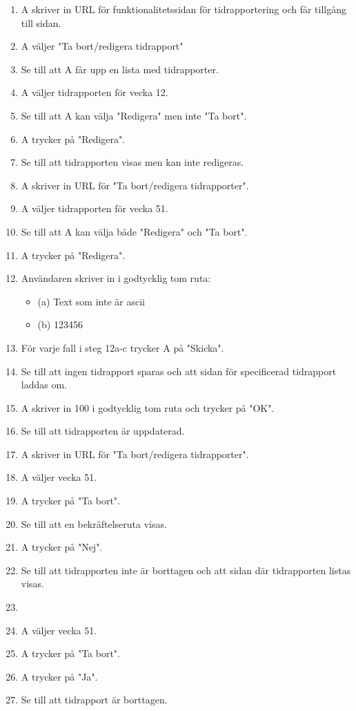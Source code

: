 \documentclass[a4paper]{article}
\begin{document}
\begin{ST}
\begin{enumerate}
\item A skriver in URL för funktionalitetssidan för tidrapportering och får tillgång till sidan.
\item A väljer "Ta bort/redigera tidrapport"
\item Se till att A får upp en lista med tidrapporter.
\item A väljer tidrapporten för vecka 12.
\item Se till att A kan välja "Redigera" men inte "Ta bort".
\item A trycker på "Redigera".
\item Se till att tidrapporten visas men kan inte redigeras.
\item A skriver in URL för "Ta bort/redigera tidrapporter".
\item A väljer tidrapporten för vecka 51.
\item Se till att A kan välja både "Redigera" och "Ta bort".
\item A trycker på "Redigera".
\item Användaren skriver in i godtycklig tom ruta:
\begin{itemize}
\item[] (a) Text som inte är ascii
\item[] (b) 123456
\end{itemize}
\item För varje fall i steg 12a-c trycker A på "Skicka". 
\item Se till att ingen tidrapport sparas och att sidan för specificerad tidrapport laddas om.
\item A skriver in 100 i godtycklig tom ruta och trycker på "OK".
\item Se till att tidrapporten är uppdaterad.
\item A skriver in URL för "Ta bort/redigera tidrapporter".
\item A väljer vecka 51.
\item A trycker på "Ta bort".
\item Se till att en bekräftelseruta visas.
\item A trycker på "Nej".
\item Se till att tidrapporten inte är borttagen och att sidan där tidrapporten listas visas.
\item \item A väljer vecka 51.
\item A trycker på "Ta bort".
\item A trycker på "Ja".
\item Se till att tidrapport är borttagen.
\end{enumerate}



\end{ST}
\end{document}
